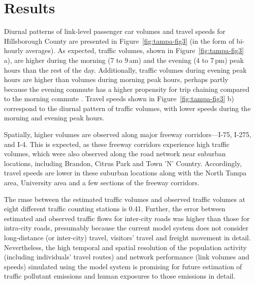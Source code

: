 \section{Results}
Diurnal patterns of link-level passenger car volumes and travel speeds for Hillsborough County are presented in Figure~\ref{fig:tampa-fig3} (in the form of bi-hourly averages). As expected, traffic volumes, shown in Figure~\ref{fig:tampa-fig3} a), are higher during the morning (7 to 9\,am) and the evening (4 to 7\,pm) peak hours than the rest of the day. Additionally, traffic volumes during evening peak hours are higher than volumes during morning peak hours, perhaps partly because the evening commute has a higher propensity for trip chaining compared to the morning commute \citep[][]{ChuYL_TRR_2003}. Travel speeds shown in Figure~\ref{fig:tampa-fig3} b) correspond to the diurnal pattern of traffic volumes, with lower speeds during the morning and evening peak hours.

Spatially, higher volumes are observed along major freeway corridors---I-75, I-275, and I-4. This is expected, as these freeway corridors experience high traffic volumes, which were also observed along the road network near suburban locations, including Brandon, Citrus Park and Town 'N' Country. Accordingly, travel speeds are lower in these suburban locations along with the North Tampa area, University area and a few sections of the freeway corridors. 

The \gls{rmse} between the estimated traffic volumes and observed traffic volumes at eight different traffic counting stations is 0.41. Further, the error between estimated and observed traffic flows for inter-city roads was higher than those for intra-city roads, presumably because the current model system does not consider long-distance (or inter-city) travel, visitors' travel and freight movement in detail. Nevertheless, the high temporal and spatial resolution of the population activity (including individuals' travel routes) and network performance (\ie link volumes and speeds) simulated using the model system is promising for future estimation of traffic pollutant emissions and human exposures to those emissions in detail.  

